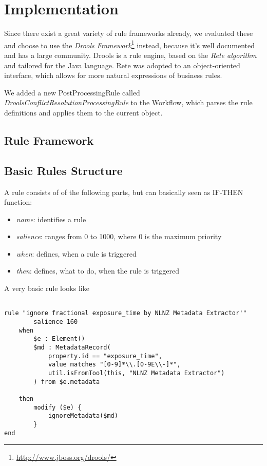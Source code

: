 \documentclass[a4paper,12pt]{article}
\begin{document}
\section{Implementation}

Since there exist a great variety of rule frameworks already, we evaluated these and choose to use the \emph{Drools Framework}\footnote{\url{http://www.jboss.org/drools/}} instead, because it's well documented and has a large community.
Drools is a rule engine, based on the \emph{Rete algorithm} and tailored for the Java language. Rete was adopted to an object-oriented interface, which allows for more natural expressions of business rules.

We added a new PostProcessingRule called \emph{DroolsConflictResolutionProcessingRule} to the Workflow, which parses the rule definitions and applies them to the current object.

\subsection{Rule Framework}

\subsection{Basic Rules Structure}

A rule consists of of the following parts, but can basically seen as IF-THEN function:
\begin{itemize}
\item \emph{name}: identifies a rule
\item \emph{salience}: ranges from 0 to 1000, where 0 is the maximum priority
\item \emph{when}: defines, when a rule is triggered
\item \emph{then}: defines, what to do, when the rule is triggered
\end{itemize}

A very basic rule looks like

\begin{lstlisting}

rule "ignore fractional exposure_time by NLNZ Metadata Extractor'"
        salience 160
    when 
        $e : Element()
        $md : MetadataRecord(
            property.id == "exposure_time",
            value matches "[0-9]*\\.[0-9E\\-]*",
            util.isFromTool(this, "NLNZ Metadata Extractor")
        ) from $e.metadata

    then
        modify ($e) {
            ignoreMetadata($md)
        }
end

\end{lstlisting}
\end{document}
